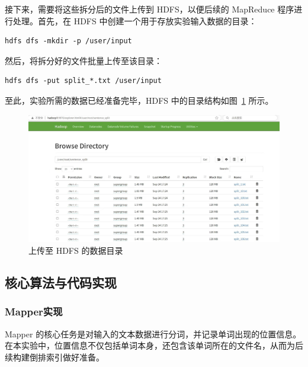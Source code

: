 \documentclass[]{bitreport}
\begin{document}
接下来，需要将这些拆分后的文件上传到 HDFS，以便后续的 MapReduce 程序进行处理。首先，在 HDFS 中创建一个用于存放实验输入数据的目录：

\begin{lstlisting}[style=shell]
hdfs dfs -mkdir -p /user/input
\end{lstlisting}

然后，将拆分好的文件批量上传至该目录：

\begin{lstlisting}[style=shell]
hdfs dfs -put split_*.txt /user/input
\end{lstlisting}

至此，实验所需的数据已经准备完毕，HDFS 中的目录结构如图~\ref{fig:hdfs_input} 所示。

\begin{figure}[H]
  \centering
  \includegraphics[width=0.9\linewidth]{figures/Step2_HDFSInput.png}
  \caption{上传至 HDFS 的数据目录}
  \label{fig:hdfs_input}
\end{figure}

\subsection{核心算法与代码实现}

\subsubsection{Mapper实现}

Mapper 的核心任务是对输入的文本数据进行分词，并记录单词出现的位置信息。在本实验中，位置信息不仅包括单词本身，还包含该单词所在的文件名，从而为后续构建倒排索引做好准备。
\end{document}

